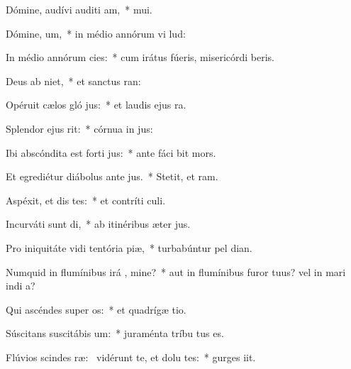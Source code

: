 \item Dómine, audívi auditi am,~*  mui.
\item Dómine,  um,~* in médio annórum vi lud:
\item In médio annórum  cies:~* cum irátus fúeris, misericórdi beris.
\item Deus ab  niet,~* et sanctus   ran:
\item Opéruit cælos gló jus:~* et laudis ejus   ra.
\item Splendor ejus   rit:~* córnua in  jus:
\item Ibi abscóndita est forti jus:~* ante fáci  bit mors.
\item Et egrediétur diábolus ante  jus.~* Stetit, et   ram.
\item Aspéxit, et dis tes:~* et contríti   culi.
\item Incurváti sunt  di,~* ab itinéribus æter jus.
\item Pro iniquitáte vidi tentória piæ,~* turbabúntur pel  dian.
\item Numquid in flumínibus irá , mine?~* aut in flumínibus furor tuus? vel in mari indi a?
\item Qui ascéndes super  os:~* et quadrígæ  tio.
\item Súscitans suscitábis  um:~* juraménta tríbu  tus es.
\item Flúvios scindes ræ:~\pscross{} vidérunt te, et dolu tes:~* gurges  iit.
